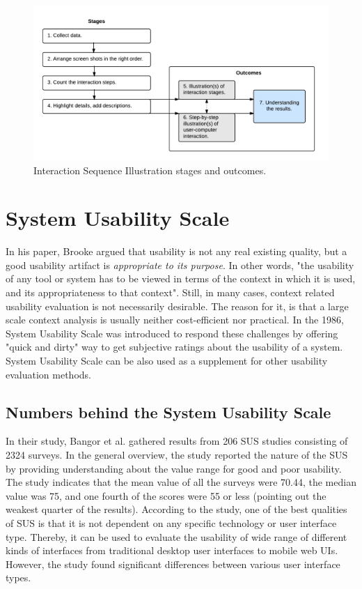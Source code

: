 \documentclass[12pt,a4paper,oneside,pdftex]{report}
\begin{document}
\begin{figure}[H]
  	\centerline{
  	\includegraphics[width=1.3\textwidth]{./images/isi_chart.png}
  	}
  	\caption{Interaction Sequence Illustration stages and outcomes.}
	\label{fig:isi_chart}
\end{figure}

\section{System Usability Scale}
\label{sec:sus}
In his paper, Brooke \citep{RefWorks:10} argued that usability is not any real existing quality, but a good usability artifact is \emph{appropriate to its purpose}. In other words, "the usability of any tool or system has to be viewed in terms of the context in which it is used, and its appropriateness to that context"\citep{RefWorks:10}. Still, in many cases, context related usability evaluation is not necessarily desirable. The reason for it, is that a large scale context analysis is usually neither cost-efficient nor practical.\citep{RefWorks:10} In the 1986, System Usability Scale was introduced to respond these challenges by offering "quick and dirty"\citep{RefWorks:10} way to get subjective ratings about the usability of a system. \citep{RefWorks:12, RefWorks:35} System Usability Scale can be also used as a supplement for other usability evaluation methods.




\subsection{Numbers behind the System Usability Scale}

In their study, Bangor et al. gathered results from 206 SUS studies consisting of 2324 surveys. In the general overview, the study reported the nature of the SUS by providing understanding about the value range for good and poor usability. The study indicates that the mean value of all the surveys were 70.44, the median value was 75, and one fourth of the scores were 55 or less (pointing out the weakest quarter of the results). According to the study, one of the best qualities of SUS is that it is not dependent on any specific technology or user interface type. Thereby, it can be used to evaluate the usability of wide range of different kinds of interfaces from traditional desktop user interfaces to mobile web UIs. However, the study found significant differences between various user interface types. \citep{RefWorks:12}	
\end{document}
